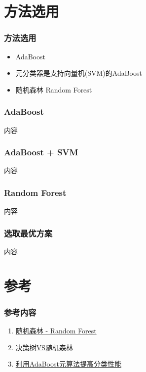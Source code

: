 \documentclass[aspectratio=43, 12pt, utf8, mathserif]{ctexbeamer} %
\begin{document}
\section{方法选用}
\begin{frame}
    \frametitle{方法选用}
    \begin{itemize}
        \item AdaBoost
        \item 元分类器是支持向量机(SVM)的AdaBoost
        \item 随机森林 Random Forest
    \end{itemize}
\end{frame}

\begin{frame}
    \frametitle{AdaBoost}
    内容
\end{frame}

\begin{frame}
    \frametitle{AdaBoost + SVM}
    内容
\end{frame}

\begin{frame}
    \frametitle{Random Forest}
    内容
\end{frame}

\begin{frame}
    \frametitle{选取最优方案}
    内容
\end{frame}

\section{参考}
\begin{frame}
    \frametitle{参考内容}
    \begin{enumerate}
        \item \href{https://zhuanlan.zhihu.com/p/44695084}{随机森林 - Random Forest}
        \item \href{https://www.jiqizhixin.com/articles/2020-06-11-6}{决策树VS随机森林}
        \item \href{https://blog.csdn.net/baidu_31657889/article/details/93891552?utm_source=app&app_version=4.7.1}{利用AdaBoost元算法提高分类性能}
    \end{enumerate}
\end{frame}

\section{}
\begin{frame}
\end{frame}
\end{document}
